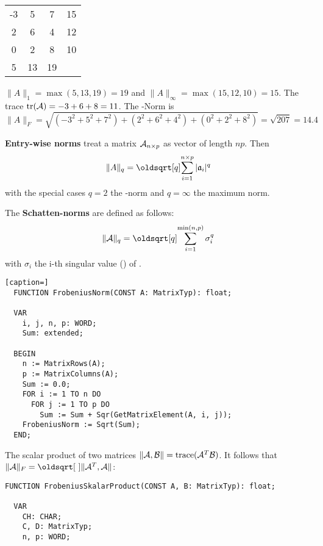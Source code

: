 \begin{refsection}
\begin{tabular}{|ccc|c}
  -3 &  5 &  7 & 15 \\
   2 &  6 &  4 & 12 \\
   0 &  2 &  8 & 10 \\
   \midrule
   5 & 13 & 19 &    \\
\end{tabular}

\( \|A\|_1 = \max(5, 13, 19) = 19 \) and \(\|A\|_\infty = \max(15, 12, 10) = 15 \). The trace \(\mathrm{tr}(\mathcal{A}) = -3 + 6 + 8 = 11 \). The -Norm is
\begin{equation}
  \|A\|_F = \sqrt{(-3^2+5^2+7^2) + (2^2+6^2+4^2) + (0^2+2^2+8^2)} = \sqrt{207} = 14.4
\end{equation}

\textbf{Entry-wise norms} treat a matrix \(\mathcal{A}_{n\times p} \) as vector of length \(np \). Then
\begin{equation}
  \|A\|_q = \sqrt[q]{\sum_{i=1}^{n\times p}{|\AbsVec{a}_{i}|^q}}
\end{equation}
with the special cases \(q=2 \) the -norm and \(q=\infty \) the maximum norm.

The \textbf{Schatten-norms} are defined as follows:
\begin{equation}
  \|\arr{A}\|_q = \sqrt[q]{\sum_{i=1}^{\min(n,p)}{\sigma_i^q}}
\end{equation}
with \(\sigma_i \) the i-th singular value () of .

\begin{lstlisting}[caption=]
  FUNCTION FrobeniusNorm(CONST A: MatrixTyp): float;

  VAR
    i, j, n, p: WORD;
    Sum: extended;

  BEGIN
    n := MatrixRows(A);
    p := MatrixColumns(A);
    Sum := 0.0;
    FOR i := 1 TO n DO
      FOR j := 1 TO p DO
        Sum := Sum + Sqr(GetMatrixElement(A, i, j));
    FrobeniusNorm := Sqrt(Sum);
  END;
\end{lstlisting}

The  scalar product of two matrices \(\|\mathcal{A,B}\| = \mathrm{trace}(\mathcal{A}^T \mathcal{B}) \). It follows that \(\|\arr{A}\|_F = \sqrt{\|\arr{A}^T, \arr{A}\|} \):

\begin{lstlisting}[caption=Frobenius skalar product]
  FUNCTION FrobeniusSkalarProduct(CONST A, B: MatrixTyp): float;

  VAR
    CH: CHAR;
    C, D: MatrixTyp;
    n, p: WORD;


\end{lstlisting}
\end{refsection}
